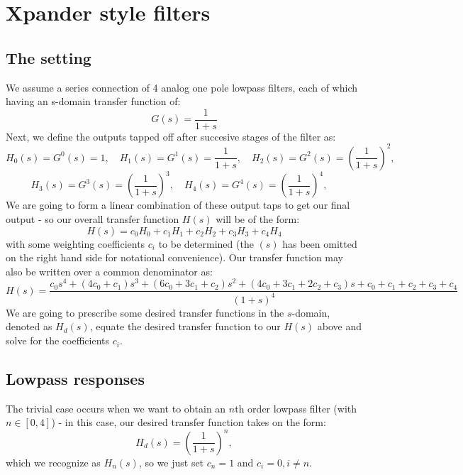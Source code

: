 \section{Xpander style filters}

\subsection{The setting}
We assume a series connection of 4 analog one pole lowpass filters, each of which having an s-domain transfer function of:
\begin{equation}
 G(s) = \frac{1}{1+s}
\end{equation}
Next, we define the outputs tapped off after succesive stages of the filter as:
\begin{equation}
 H_0(s) = G^0(s) = 1,                                \quad
 H_1(s) = G^1(s) =        \frac{1}{1+s},             \quad
 H_2(s) = G^2(s) = \left( \frac{1}{1+s} \right)^2,   \quad  
\end{equation}
\begin{equation}
 H_3(s) = G^3(s) = \left( \frac{1}{1+s} \right)^3,   \quad 
 H_4(s) = G^4(s) = \left( \frac{1}{1+s} \right)^4,   \quad   
\end{equation}
We are going to form a linear combination of these output taps to get our final output - so our overall transfer function $H(s)$ will be of the form:
\begin{equation}
 H(s) = c_0 H_0 + c_1 H_1 + c_2 H_2 + c_3 H_3 + c_4 H_4
\end{equation}
with some weighting coefficients $c_i$ to be determined (the $(s)$ has been omitted on the right hand side for notational convenience). Our transfer function may also be written over a common denominator as:
\begin{equation}
 H(s) = \frac{c_0 s^4 + (4c_0+c_1)s^3 + (6c_0+3c_1+c_2)s^2 + (4c_0+3c_1+2c_2+c_3)s + c_0+c_1+c_2+c_3+c_4}{(1+s)^4}
\end{equation}
We are going to prescribe some desired transfer functions in the $s$-domain, denoted as $H_d(s)$, equate the desired transfer function to our $H(s)$ above and solve for the coefficients $c_i$. 

\subsection{Lowpass responses}
The trivial case occurs when we want to obtain an $n$th order lowpass filter (with $n \in [0,4]$) - in this case, our desired transfer function takes on the form:
\begin{equation}
 H_d(s) = \left( \frac{1}{1+s} \right)^n,
\end{equation}
which we recognize as $H_n(s)$, so we just set $c_n = 1$ and $c_i = 0, i \neq n$.

